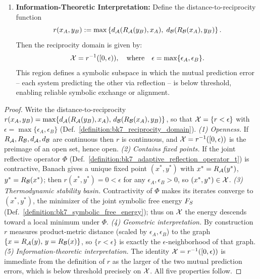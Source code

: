 \begin{proposition}
\begin{enumerate}
    \item \textbf{Information-Theoretic Interpretation:} 
    Define the distance-to-reciprocity function
    \[
    r(x_A, y_B) := \max\left\{
      d_{\mathcal{A}}(R_{\mathcal{A}}(y_B), x_A),\;
      d_{\mathcal{B}}(R_{\mathcal{B}}(x_A), y_B)
    \right\}.
    \]
    Then the reciprocity domain is given by:
    \[
    \mathcal{X} = r^{-1}([0, \epsilon)), \quad \text{where} \quad
    \epsilon = \max\{\epsilon_A, \epsilon_B\}.
    \]
    This region defines a symbolic subspace in which the mutual prediction error -- each system predicting the other via reflection -- is below threshold, enabling reliable symbolic exchange or alignment.
\end{enumerate}
\end{proposition}
\begin{proof}
\label{proof:bk7_structural_properties_of_reciprocity_domain}
\leavevmode
Write the distance-to-reciprocity $r(x_A,y_B)=\max\{d_{\mathcal{A}}(R_{\mathcal{A}}(y_B),x_A),\,d_{\mathcal{B}}(R_{\mathcal{B}}(x_A),y_B)\}$, so that $\mathcal{X}=\{r<\epsilon\}$ with $\epsilon=\max\{\epsilon_A,\epsilon_B\}$ (Def.~\ref{definition:bk7_reciprocity_domain}). \emph{(1) Openness.} If $R_{\mathcal{A}},R_{\mathcal{B}},d_{\mathcal{A}},d_{\mathcal{B}}$ are continuous then $r$ is continuous, and $\mathcal{X}=r^{-1}([0,\epsilon))$ is the preimage of an open set, hence open. \emph{(2) Contains fixed points.} If the joint reflective operator $\Phi$ (Def.~\ref{definition:bk7_adaptive_reflection_operator_t}) is contractive, Banach gives a unique fixed point $(x^*,y^*)$ with $x^*=R_{\mathcal{A}}(y^*)$, $y^*=R_{\mathcal{B}}(x^*)$; then $r(x^*,y^*)=0<\epsilon$ for any $\epsilon_A,\epsilon_B>0$, so $(x^*,y^*)\in\mathcal{X}$. \emph{(3) Thermodynamic stability basin.} Contractivity of $\Phi$ makes its iterates converge to $(x^*,y^*)$, the minimizer of the joint symbolic free energy $F_S$ (Def.~\ref{definition:bk7_symbolic_free_energy}); thus on $\mathcal{X}$ the energy descends toward a local minimum under $\Phi$. \emph{(4) Geometric interpretation.} By construction $r$ measures product-metric distance (scaled by $\epsilon_A,\epsilon_B$) to the graph $\{x=R_{\mathcal{A}}(y),\,y=R_{\mathcal{B}}(x)\}$, so $\{r<\epsilon\}$ is exactly the $\epsilon$-neighborhood of that graph. \emph{(5) Information-theoretic interpretation.} The identity $\mathcal{X}=r^{-1}([0,\epsilon))$ is immediate from the definition of $r$ as the larger of the two mutual prediction errors, which is below threshold precisely on $\mathcal{X}$. All five properties follow.
\end{proof}
